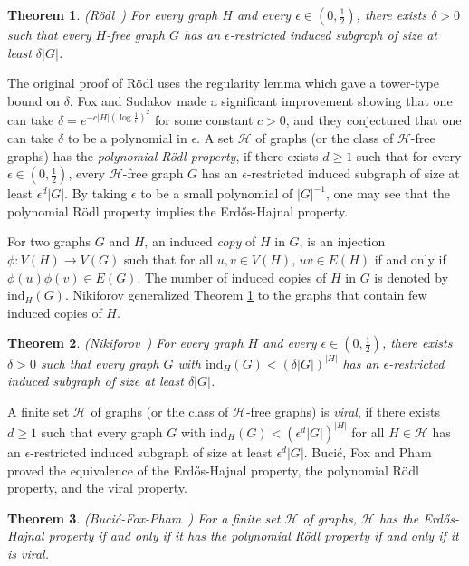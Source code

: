 \documentclass[a4paper,11pt]{article}
\newtheorem{theorem}{Theorem}[section]
\begin{document}
\begin{theorem}\label{thm:Rodl}
\textnormal{(R\"odl~\cite{Ro86})} For every graph $H$ and every $\epsilon\in(0,\frac{1}{2})$, there exists $\delta>0$ such that every $H$-free graph $G$ has an $\epsilon$-restricted induced subgraph of size at least $\delta|G|$.
\end{theorem}

The original proof of R\"odl uses the regularity lemma which gave
a tower-type bound on $\delta$.
Fox and Sudakov \cite{FS08} made a significant
improvement showing that one can take $\delta=e^{-c|H|(\log \frac{1}{\epsilon})^{2}}$ for some constant $c>0$, and they conjectured that one can take $\delta$ to be a polynomial in $\epsilon$. 
A set $\mathcal{H}$ of graphs (or the class of $\mathcal{H}$-free graphs) has the {\em polynomial R\"odl property}, if there exists $d\geq 1$ such that for every $\epsilon\in(0,\frac{1}{2})$, every $\mathcal{H}$-free graph $G$ has an $\epsilon$-restricted induced subgraph of size at least $\epsilon^d|G|$. By taking $\epsilon$ to be a small polynomial of $|G|^{-1}$, one may see that the polynomial R\"odl property implies the Erd\H{o}s-Hajnal property.

For two graphs $G$ and $H$, an induced {\em copy} of $H$ in $G$, is an injection $\phi:V(H)\rightarrow V(G)$ such that for all $u,v\in V(H)$, $uv\in E(H)$ if and only if $\phi(u)\phi(v)\in E(G)$. The number of induced copies of $H$ in $G$ is denoted by $\mathrm{ind}_H(G)$.
Nikiforov generalized Theorem \ref{thm:Rodl} to the graphs that contain few induced copies of $H$.

\begin{theorem}\label{thm:Nikiforov}
\textnormal{(Nikiforov~\cite{Ni06})} 
For every graph $H$ and every $\epsilon\in(0,\frac{1}{2})$, there exists $\delta>0$ such that every graph $G$ with $\mathrm{ind}_H(G)<(\delta|G|)^{|H|}$ has an $\epsilon$-restricted induced subgraph of size at least $\delta|G|$.
\end{theorem}

A finite set $\mathcal{H}$  of graphs (or the class of $\mathcal{H}$-free graphs) is {\em viral}, if there exists $d\geq 1$ such that every graph $G$ with $\mathrm{ind}_{H}(G)<(\epsilon^d|G|)^{|H|}$ for all $H\in\mathcal{H}$ has an $\epsilon$-restricted induced subgraph of size at least $\epsilon^d|G|$. Buci\'c, Fox and Pham~\cite{BFP24} proved the equivalence of the Erd\H{o}s-Hajnal property, the polynomial R\"odl property, and the viral property.

\begin{theorem}\label{thm:E-H-poly-Rodl-viral-equivalent}
\textnormal{(Buci\'c-Fox-Pham~\cite{BFP24})} 
For a finite set $\mathcal{H}$ of graphs, $\mathcal{H}$ has the Erd\H{o}s-Hajnal property if and only if it has the polynomial R\"odl property if and only if it is viral.
\end{theorem}
\end{document}
